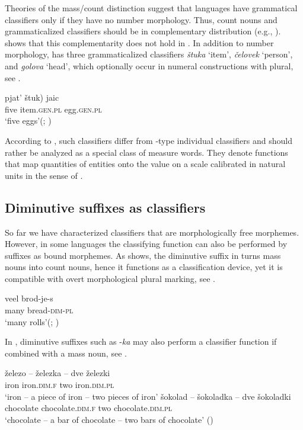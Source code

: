 \documentclass[output=paper]{langscibook}
\begin{document}
Theories of the mass/count distinction suggest that languages have grammatical classifiers only if they have no number morphology. Thus, count nouns and grammaticalized classifiers should be in complementary distribution (e.g., \citealt{Borer2005, Chierchia2010}). \cite{Khrizman2016} shows that this complementarity does not hold in . In addition to number morphology,  has three grammaticalized classifiers \textit{štuka} `item', \textit{čelovek} `person', and \textit{golova} `head', which optionally occur in numeral constructions with plural, see .

\ea \label{ex:16}
\gll pjat' \minsp{(} štuk) jaic\\
    five {} item.\textsc{gen.pl} egg.\textsc{gen.pl}\\
\glt `five eggs'\hfill (; \citealt{Khrizman2016})
\z

\noindent According to \cite{Khrizman2016}, such classifiers differ from -type individual classifiers and should rather be analyzed as a special class of measure words. They denote functions that map quantities of entities onto the value on a scale calibrated in natural units in the sense of \cite{Krifka1989,Krifka1995}.



\subsection{Diminutive suffixes as classifiers}

So far we have characterized classifiers that are morphologically free morphemes. However, in some languages the classifying function can also be performed by suffixes as bound morphemes.  As \cite{DeBelder2008} shows, the diminutive suffix in  turns mass nouns into count nouns, hence it functions as a classification device, yet it is compatible with overt morphological plural marking, see .

\ea \label{ex:17}
\gll veel brod-je-s\\
   many bread-\textsc{dim-pl} \\
\glt `many rolls'\hfill (; \citealt[2]{DeBelder2008})
\z

\noindent In , diminutive suffixes such as -\textit{ka} may also perform a classifier function if combined with a mass noun, see .

\ea \label{ex:18}
\ea
\gll železo -- železka -- dve železki \\
iron {} iron.\textsc{dim.f} {} two iron.\textsc{dim.pl}\\
\glt `iron -- a piece of iron -- two pieces of iron'
\ex
\gll  šokolad -- šokoladka -- dve šokoladki\\
chocolate {}	chocolate.\textsc{dim.f} {} two chocolate.\textsc{dim.pl}\\
\glt `chocolate -- a bar of chocolate -- two bars of chocolate' \hfill ()
\z \z
\end{document}
